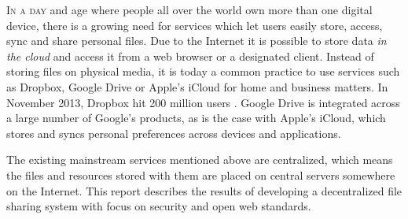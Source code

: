 \lettrine[lines=3]{I}{n a day} and age where people all over the world own more than one digital device, there is a growing need for services which let users easily store, access, sync and share personal files. Due to the Internet it is possible to store data \emph{in the cloud} and access it from a web browser or a designated client. Instead of storing files on physical media, it is today a common practice to use services such as Dropbox, Google Drive or Apple's iCloud for home and business matters. In November 2013, Dropbox hit 200 million users \cite{Constine:2013:Online}. Google Drive is integrated across a large number of Google's products, as is the case with Apple's iCloud, which stores and syncs personal preferences across devices and applications.

The existing mainstream services mentioned above are centralized, which means the files and resources stored with them are placed on central servers somewhere on the Internet. This report describes the results of developing a decentralized file sharing system with focus on security and open web standards.






